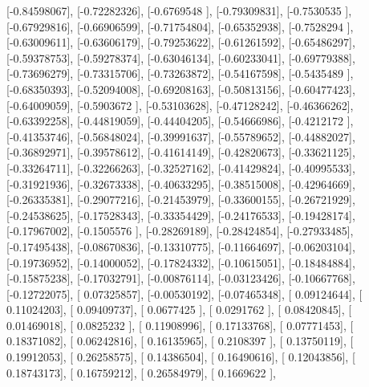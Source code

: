 \documentclass{article}
\begin{document}
       [-0.84598067],
       [-0.72282326],
       [-0.6769548 ],
       [-0.79309831],
       [-0.7530535 ],
       [-0.67929816],
       [-0.66906599],
       [-0.71754804],
       [-0.65352938],
       [-0.7528294 ],
       [-0.63009611],
       [-0.63606179],
       [-0.79253622],
       [-0.61261592],
       [-0.65486297],
       [-0.59378753],
       [-0.59278374],
       [-0.63046134],
       [-0.60233041],
       [-0.69779388],
       [-0.73696279],
       [-0.73315706],
       [-0.73263872],
       [-0.54167598],
       [-0.5435489 ],
       [-0.68350393],
       [-0.52094008],
       [-0.69208163],
       [-0.50813156],
       [-0.60477423],
       [-0.64009059],
       [-0.5903672 ],
       [-0.53103628],
       [-0.47128242],
       [-0.46366262],
       [-0.63392258],
       [-0.44819059],
       [-0.44404205],
       [-0.54666986],
       [-0.4212172 ],
       [-0.41353746],
       [-0.56848024],
       [-0.39991637],
       [-0.55789652],
       [-0.44882027],
       [-0.36892971],
       [-0.39578612],
       [-0.41614149],
       [-0.42820673],
       [-0.33621125],
       [-0.33264711],
       [-0.32266263],
       [-0.32527162],
       [-0.41429824],
       [-0.40995533],
       [-0.31921936],
       [-0.32673338],
       [-0.40633295],
       [-0.38515008],
       [-0.42964669],
       [-0.26335381],
       [-0.29077216],
       [-0.21453979],
       [-0.33600155],
       [-0.26721929],
       [-0.24538625],
       [-0.17528343],
       [-0.33354429],
       [-0.24176533],
       [-0.19428174],
       [-0.17967002],
       [-0.1505576 ],
       [-0.28269189],
       [-0.28424854],
       [-0.27933485],
       [-0.17495438],
       [-0.08670836],
       [-0.13310775],
       [-0.11664697],
       [-0.06203104],
       [-0.19736952],
       [-0.14000052],
       [-0.17824332],
       [-0.10615051],
       [-0.18484884],
       [-0.15875238],
       [-0.17032791],
       [-0.00876114],
       [-0.03123426],
       [-0.10667768],
       [-0.12722075],
       [ 0.07325857],
       [-0.00530192],
       [-0.07465348],
       [ 0.09124644],
       [ 0.11024203],
       [ 0.09409737],
       [ 0.0677425 ],
       [ 0.0291762 ],
       [ 0.08420845],
       [ 0.01469018],
       [ 0.0825232 ],
       [ 0.11908996],
       [ 0.17133768],
       [ 0.07771453],
       [ 0.18371082],
       [ 0.06242816],
       [ 0.16135965],
       [ 0.2108397 ],
       [ 0.13750119],
       [ 0.19912053],
       [ 0.26258575],
       [ 0.14386504],
       [ 0.16490616],
       [ 0.12043856],
       [ 0.18743173],
       [ 0.16759212],
       [ 0.26584979],
       [ 0.1669622 ],
\end{document}
